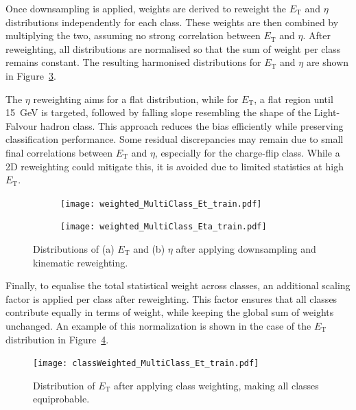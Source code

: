 Once downsampling is applied, weights are derived to reweight the $E_{\text{T}}$ and $\eta$ distributions independently for each class. These weights are then combined by multiplying the two, assuming no strong correlation between $E_{\text{T}}$ and $\eta$. After reweighting, all distributions are normalised so that the sum of weight per class remains constant. The resulting harmonised distributions for $E_{\text{T}}$ and $\eta$ are shown in Figure~\ref{fig:et_eta_reweighted}.

The $\eta$ reweighting aims for a flat distribution, while for $E_{\text{T}}$, a flat region until 15~GeV is targeted, followed by falling slope resembling the shape of the Light-Falvour hadron class. This approach reduces the bias efficiently while preserving classification performance. Some residual discrepancies may remain due to small final correlations between $E_{\text{T}}$ and $\eta$, especially for the charge-flip class. While a 2D reweighting could mitigate this, it is avoided due to limited statistics at high $E_{\text{T}}$.

\begin{figure}[htbp]
  \centering
  \begin{subfigure}[b]{0.6\textwidth}
      \centering
      \texttt{[image: weighted\_MultiClass\_Et\_train.pdf]}
      \caption{}
      \label{fig:et_reweighted}
  \end{subfigure}
  \begin{subfigure}[b]{0.6\textwidth}
      \centering
      \texttt{[image: weighted\_MultiClass\_Eta\_train.pdf]}
      \caption{}
      \label{fig:eta_reweighted}
  \end{subfigure}
  \caption{Distributions of (a) $E_{\text{T}}$ and (b) $\eta$ after applying downsampling and kinematic reweighting.}
  \label{fig:et_eta_reweighted}
\end{figure}

Finally, to equalise the total statistical weight across classes, an additional scaling factor is applied per class after reweighting. This factor ensures that all classes contribute equally in terms of weight, while keeping the global sum of weights unchanged. An example of this normalization is shown in the case of the $E_{\text{T}}$ distribution in Figure~\ref{fig:et_classWeighted}.

\begin{figure}[htbp]
  \centering
  \texttt{[image: classWeighted\_MultiClass\_Et\_train.pdf]}
  \caption{Distribution of $E_{\text{T}}$ after applying class weighting, making all classes equiprobable.}
  \label{fig:et_classWeighted}
\end{figure}


